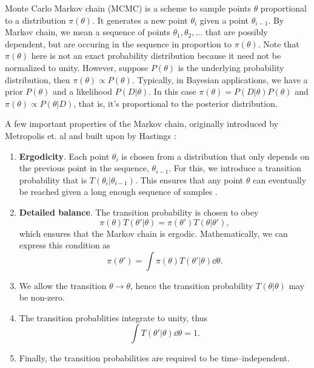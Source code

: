 Monte Carlo Markov chain (MCMC) is a scheme to sample points $\theta$ proportional to a distribution $\pi(\theta)$. It generates a new point $\theta_i$ given a point $\theta_{i-1}$. 
By Markov chain, we mean a sequence of points $\theta_1, \theta_2, \ldots$ that are possibly dependent, but are occuring in the sequence in proportion to $\pi(\theta)$. Note that $\pi(\theta)$ here is not an exact probability distribution because it need not be normalized to unity.
However, suppose $P(\theta)$ is the underlying probability distribution, then $\pi(\theta) \propto P(\theta)$. Typically, in Bayesian applications, we have a prior $P(\theta)$ and a likelihood $P(D|\theta)$. In this case $\pi(\theta) = P(D|\theta)P(\theta)$ and 
$\pi(\theta) \propto P(\theta|D)$, that is, it's proportional to the posterior distribution.


A few important properties of the Markov chain, originally introduced by Metropolis et. al and built upon by Hastings \cite{metropolis}:
\begin{enumerate}
  \item \textbf{Ergodicity}. Each point $\theta_i$ is chosen from a distribution that only depends on the previous point in the sequence, $\theta_{i-1}$. For this, we introduce a transition probability that is  $T(\theta_i|\theta_{i-1})$. This ensures that any point $\theta$ can eventually be reached given a long enough sequence of samples \cite{numerical_recipies}. 
  \item \textbf{Detailed balance}. The transition probability is chosen to obey $$\pi(\theta)T(\theta'|\theta) = \pi(\theta')T(\theta|\theta'),$$ which ensures that the Markov chain is ergodic. Mathematically, we can express this condition as
  $$\pi(\theta') = \int \pi(\theta)T(\theta'|\theta)\dd\theta.$$
  \item We allow the transition $\theta \to \theta$, hence the transition probability $T(\theta|\theta)$ may be non-zero.
  \item The transition probablities integrate to unity, thus $$\int T(\theta'|\theta)\dd\theta = 1.$$
  \item Finally, the transition probabilities are required to be time--independent.
\end{enumerate}


